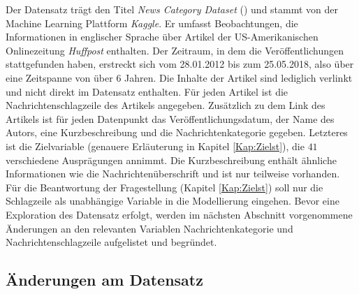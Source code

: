\documentclass[a4paper,11pt]{article}
\begin{document}
Der Datensatz trägt den Titel \textit{News Category Dataset} (\cite{dataset}) und stammt von der Machine Learning Plattform \textit{Kaggle}. Er umfasst  Beobachtungen, die Informationen in englischer Sprache über Artikel der US-Amerikanischen Onlinezeitung \textit{Huffpost} enthalten. Der Zeitraum, in dem die Veröffentlichungen stattgefunden haben, erstreckt sich vom 28.01.2012 bis zum 25.05.2018, also über eine Zeitspanne von über $6$ Jahren. Die Inhalte der Artikel sind lediglich verlinkt und nicht direkt im Datensatz enthalten. Für jeden Artikel ist die Nachrichtenschlagzeile des Artikels angegeben. Zusätzlich zu dem Link des Artikels ist für jeden Datenpunkt das Veröffentlichungsdatum, der Name des Autors, eine Kurzbeschreibung und die Nachrichtenkategorie gegeben. Letzteres ist die Zielvariable (genauere Erläuterung in Kapitel \ref{Kap:Zielst}), die $41$ verschiedene Ausprägungen annimmt. Die Kurzbeschreibung enthält ähnliche Informationen wie die Nachrichtenüberschrift und ist nur teilweise vorhanden. Für die Beantwortung der Fragestellung (Kapitel \ref{Kap:Zielst}) soll nur die Schlagzeile als unabhängige Variable in die Modellierung eingehen. Bevor eine Exploration des Datensatz erfolgt, werden im nächsten Abschnitt vorgenommene Änderungen an den relevanten Variablen Nachrichtenkategorie und Nachrichtenschlagzeile aufgelistet und begründet.


\subsection{Änderungen am Datensatz} \label{kap:2_2Aend}
\end{document}

